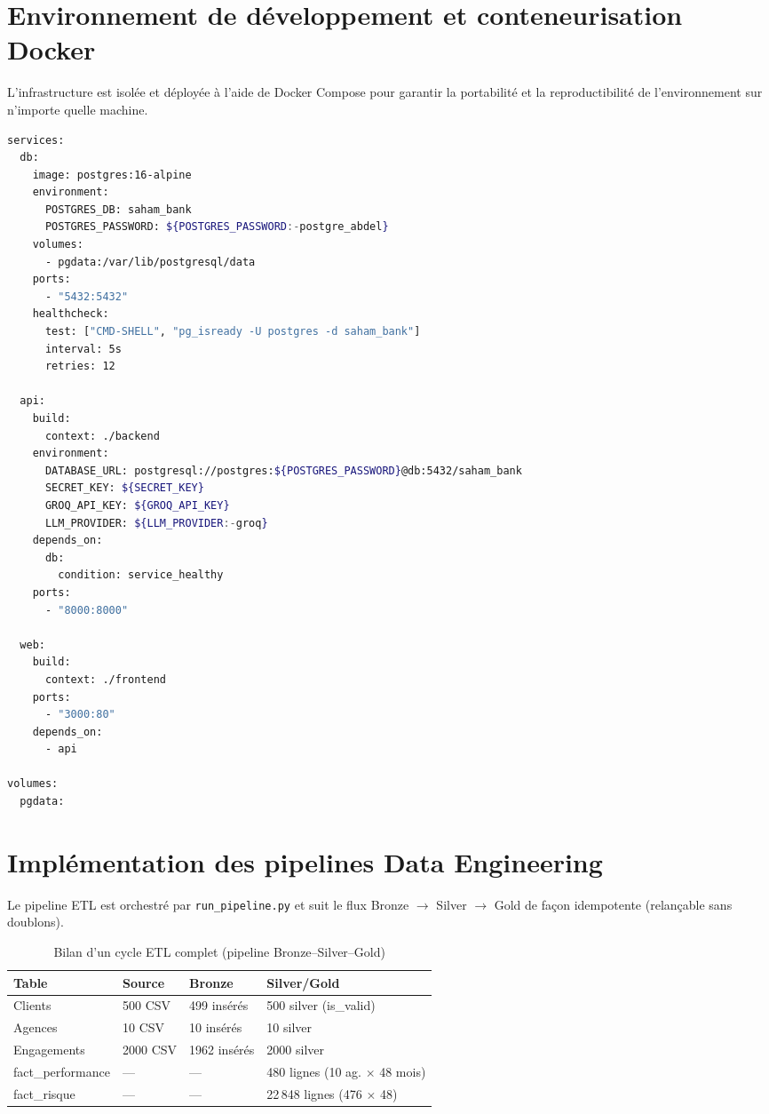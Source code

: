 \documentclass[a4paper,12pt]{report}
\begin{document}
\section{Environnement de développement et conteneurisation Docker}
\begin{doublespace}
L'infrastructure est isolée et déployée à l'aide de Docker Compose pour garantir la portabilité et la reproductibilité de l'environnement sur n'importe quelle machine.

\begin{lstlisting}[language=bash, caption={Fichier de déploiement docker-compose.yml du projet}]
services:
  db:
    image: postgres:16-alpine
    environment:
      POSTGRES_DB: saham_bank
      POSTGRES_PASSWORD: ${POSTGRES_PASSWORD:-postgre_abdel}
    volumes:
      - pgdata:/var/lib/postgresql/data
    ports:
      - "5432:5432"
    healthcheck:
      test: ["CMD-SHELL", "pg_isready -U postgres -d saham_bank"]
      interval: 5s
      retries: 12

  api:
    build:
      context: ./backend
    environment:
      DATABASE_URL: postgresql://postgres:${POSTGRES_PASSWORD}@db:5432/saham_bank
      SECRET_KEY: ${SECRET_KEY}
      GROQ_API_KEY: ${GROQ_API_KEY}
      LLM_PROVIDER: ${LLM_PROVIDER:-groq}
    depends_on:
      db:
        condition: service_healthy
    ports:
      - "8000:8000"

  web:
    build:
      context: ./frontend
    ports:
      - "3000:80"
    depends_on:
      - api

volumes:
  pgdata:
\end{lstlisting}
\end{doublespace}

\section{Implémentation des pipelines Data Engineering}
\begin{doublespace}
Le pipeline ETL est orchestré par \texttt{run\_pipeline.py} et suit le flux Bronze $\rightarrow$ Silver $\rightarrow$ Gold de façon idempotente (relançable sans doublons).

\begin{table}[H]
\centering
\begin{tabular}{|p{4cm}|p{3cm}|p{3cm}|p{3cm}|}
    \hline
    \textbf{Table} & \textbf{Source} & \textbf{Bronze} & \textbf{Silver/Gold} \\
    \hline
    Clients & 500 CSV & 499 insérés & 500 silver (is\_valid) \\
    \hline
    Agences & 10 CSV & 10 insérés & 10 silver \\
    \hline
    Engagements & 2000 CSV & 1962 insérés & 2000 silver \\
    \hline
    fact\_performance & — & — & 480 lignes (10 ag. $\times$ 48 mois) \\
    \hline
    fact\_risque & — & — & 22\,848 lignes (476 $\times$ 48) \\
    \hline
\end{tabular}
\caption{Bilan d'un cycle ETL complet (pipeline Bronze–Silver–Gold)}
\label{tab:etl_results}
\end{table}
\end{doublespace}
\end{document}
